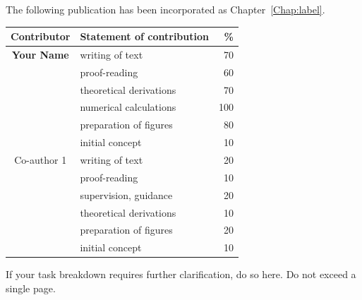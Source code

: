 \cleartoevenpage
\pagestyle{empty}	

\noindent
The following publication has been incorporated as Chapter~\ref{Chap:label}.

\noindent
{}

\begin{table}[h]
	\centering
	\begin{tabular}{clr}
		\toprule
		Contributor & Statement of contribution & \% \\
		\midrule
		\textbf{Your Name}				& writing of text 					& 70\\
															& proof-reading							& 60 \\
															& theoretical derivations 	& 70\\
															& numerical calculations 		& 100\\
															& preparation of figures 		& 80 \\
															& initial concept						& 10 \\
		\midrule
		Co-author 1								& writing of text 					& 20\\
															& proof-reading							& 10 \\
															& supervision, guidance 		& 20\\
															& theoretical derivations 	& 10\\
															& preparation of figures 		& 20 \\
															& initial concept						& 10 \\
		\bottomrule
	\end{tabular}
\end{table}

If your task breakdown requires further clarification, do so here. Do not exceed a single page.


